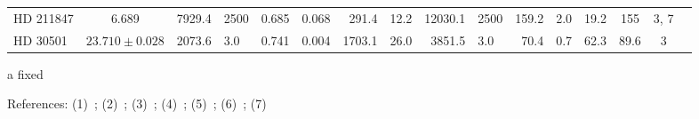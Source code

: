 \begin{table*}
\begin{threeparttable}[b]
\begin{tabular}{l c r@{$ \,\pm\, $}l r@{$ \,\pm\, $}l r@{$ \,\pm\, $}l r@{$ \,\pm\, $}l r@{$ \,\pm\, $}l cc c c}
            {HD 211847}  & 6.689\tnote{a}    & 7929.4  & 2500      & 0.685 & 0.068 & 291.4  & 12.2 & 12030.1 & 2500 & 159.2    & 2.0 & 19.2  & 155          & 3, 7 \\
            {HD 30501}   & $23.710\pm0.028$  & 2073.6  & 3.0       & 0.741 & 0.004 & 1703.1 & 26.0 & 3851.5  & 3.0  & 70.4     & 0.7 & 62.3  & 89.6         & 3    \\
            \bottomrule
        \end{tabular} \label{tab:orbitparams}
        \begin{tablenotes}
            \item [a]{fixed}
            \item[]References: (1)~\citet{crepp_trends_2016}; (2)~\citet{udry_coralie_2002}; (3)~\citet{sahlmann_search_2011};   (4)~\citet{pilyavsky_search_2011}; (5)~\citet{correia_coralie_2005};  (6)~\citet{benedict_hd_2017}; (7)~\citet{moutou_eccentricity_2017}
        \end{tablenotes}
    \end{threeparttable}
\end{table*}
